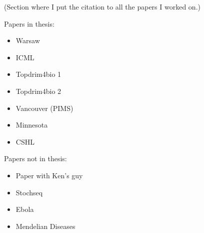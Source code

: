 (Section where I put the citation to all the papers I worked on.)

Papers in thesis:

\begin{itemize}
\item Warsaw
\item ICML
\item Topdrim4bio 1
\item Topdrim4bio 2
\end{itemize}

\begin{itemize}
\item Vancouver (PIMS)
\item Minnesota
\item CSHL
\end{itemize}

Papers not in thesis:

\begin{itemize}
\item Paper with Ken's guy
\item Stochseq
\item Ebola
\item Mendelian Diseases
\end{itemize}